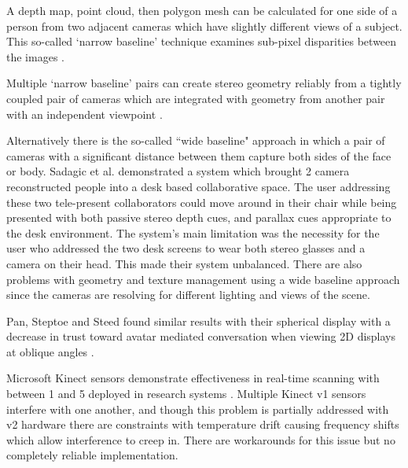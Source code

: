 A depth map, point cloud, then polygon mesh can be calculated for one side of a person from two adjacent cameras which have slightly different views of a subject.  This so-called `narrow baseline' technique examines sub-pixel disparities between the images \cite{Knoblauch2008}. \par
Multiple `narrow baseline' pairs can create stereo geometry reliably from a tightly coupled pair of cameras which are integrated with geometry from another pair with an independent viewpoint \cite{Okutomi:1993ez, Cooke2002, Cooke2002a}. \par
Alternatively there is the so-called ``wide baseline" approach in which a pair of cameras with a significant distance between them capture both sides of the face or body. Sadagic et al. demonstrated a system which brought 2 camera reconstructed \cite{Sadagic2001} people into a desk based collaborative space. The user addressing these two tele-present collaborators could move around in their chair while being presented with both passive stereo depth cues, and parallax cues appropriate to the desk environment. The system's main limitation was the necessity for the user who addressed the two desk screens to wear both stereo glasses and a camera on their head. This made their system unbalanced.  There are also problems with geometry and texture management using a wide baseline approach since the cameras are resolving for different lighting and views of the scene.\par
      Pan, Steptoe and Steed found similar results with their spherical display with a decrease in trust toward avatar mediated conversation when viewing 2D displays at oblique angles \cite{pan2014comparing}.\par
Microsoft Kinect sensors demonstrate effectiveness in real-time scanning with between 1 and 5 deployed in research systems \cite{Mekuria2013}. Multiple Kinect v1 sensors interfere with one another, and though this problem is partially addressed with v2 hardware there are constraints with temperature drift causing frequency shifts which allow interference to creep in. There are workarounds for this issue but no completely reliable implementation.\par

